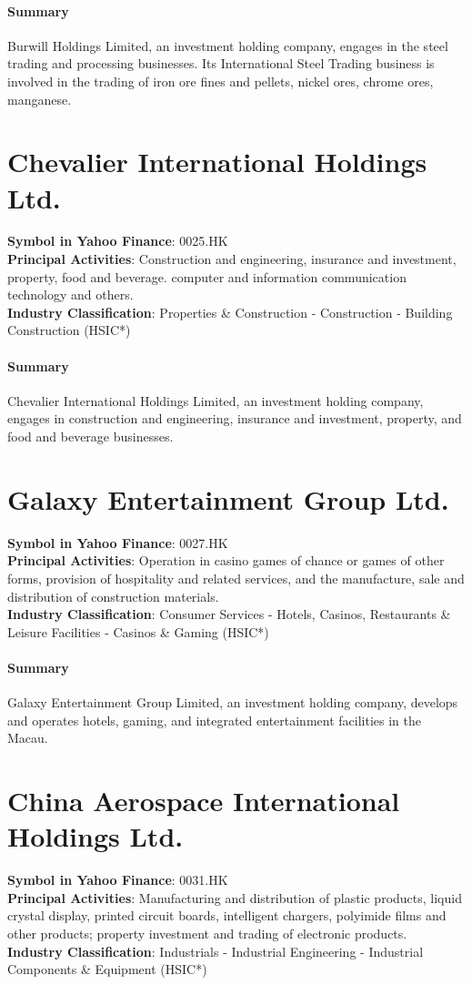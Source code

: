 \paragraph{Summary}
Burwill Holdings Limited, an investment holding company, engages in the steel trading and processing businesses. Its International Steel Trading business is involved in the trading of iron ore fines and pellets, nickel ores, chrome ores, manganese.


\section{Chevalier International Holdings Ltd.}
\textbf{Symbol in Yahoo Finance}: 0025.HK\\
\textbf{Principal Activities}: Construction and engineering, insurance and investment, property, food and beverage. computer and information communication technology and others.\\
\textbf{Industry Classification}: Properties \& Construction - Construction - Building Construction (HSIC*)
\paragraph{Summary}
Chevalier International Holdings Limited, an investment holding company, engages in construction and engineering, insurance and investment, property, and food and beverage businesses.


\section{Galaxy Entertainment Group Ltd.}
\textbf{Symbol in Yahoo Finance}: 0027.HK\\
\textbf{Principal Activities}: Operation in casino games of chance or games of other forms, provision of hospitality and related services, and the manufacture, sale and distribution of construction materials.\\
\textbf{Industry Classification}: Consumer Services - Hotels, Casinos, Restaurants \& Leisure Facilities - Casinos \& Gaming (HSIC*)
\paragraph{Summary}
Galaxy Entertainment Group Limited, an investment holding company, develops and operates hotels, gaming, and integrated entertainment facilities in the Macau.


\section{China Aerospace International Holdings Ltd.}
\textbf{Symbol in Yahoo Finance}: 0031.HK\\
\textbf{Principal Activities}: Manufacturing and distribution of plastic products, liquid crystal display, printed circuit boards, intelligent chargers, polyimide films and other products; property investment and trading of electronic products.\\
\textbf{Industry Classification}: Industrials - Industrial Engineering - Industrial Components \& Equipment (HSIC*)
